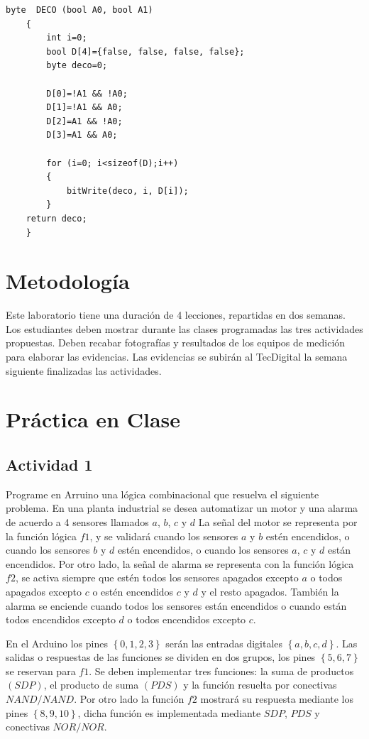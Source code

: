\begin{lstlisting}[language=Arduino,numbers=none, showstringspaces=false]
	byte  DECO (bool A0, bool A1)
	{
		int i=0;
		bool D[4]={false, false, false, false};
		byte deco=0;
	
		D[0]=!A1 && !A0;
		D[1]=!A1 && A0;
		D[2]=A1 && !A0;
		D[3]=A1 && A0;
	
		for (i=0; i<sizeof(D);i++)
		{
			bitWrite(deco, i, D[i]);
		}
	return deco;
	}
\end{lstlisting}
  
\section{Metodología}

Este laboratorio tiene una duración de 4 lecciones, repartidas en dos semanas. Los estudiantes deben mostrar durante las clases programadas las tres actividades propuestas. Deben recabar fotografías y resultados de los equipos de medición para elaborar las evidencias. Las evidencias se subirán al TecDigital la semana siguiente finalizadas las actividades.

\section{Práctica en Clase}

\subsection{Actividad 1}

Programe en Arruino una lógica combinacional que resuelva el siguiente problema.  En una planta industrial se desea automatizar un motor y una alarma de acuerdo a 4 sensores llamados $a$, $b$, $c$ y $d$  La señal del motor se representa por la función lógica $f1$, y se validará  cuando los sensores $a$ y $b$ estén encendidos, o cuando los sensores $b$ y $d$ estén encendidos, o cuando los sensores $a$, $c$ y $d$ están encendidos. Por otro lado, la señal de  alarma se representa con la función lógica $f2$, se activa siempre que estén todos los sensores apagados excepto $a$ o todos apagados excepto $c$ o estén encendidos $c$ y $d$ y el resto apagados. También la alarma se enciende cuando todos los sensores están encendidos o cuando están todos encendidos excepto $d$ o todos encendidos excepto $c$.
 
 En el Arduino los pines $\left\lbrace 0,1,2,3\right\rbrace$ serán las entradas digitales $\left\lbrace a,b,c,d\right\rbrace$. Las salidas o respuestas de las funciones se dividen en dos grupos, los pines $\left\lbrace 5,6,7\right\rbrace $ se reservan para $f1$. Se deben implementar tres funciones:  la suma de productos $(SDP)$, el producto de suma $(PDS)$ y la función resuelta por conectivas $NAND/NAND$.   Por otro lado la función $f2$  mostrará su respuesta mediante los pines 
 $\left\lbrace 8,9,10\right\rbrace $, dicha función es implementada mediante $SDP$, $PDS$ y conectivas $NOR/NOR$.
 
